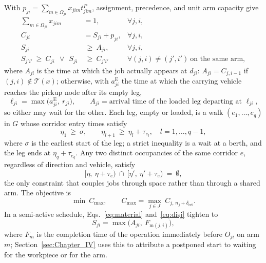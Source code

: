 \documentclass[manuscript,screen,review]{acmart}
\begin{document}
With $p_{ji}=\sum_{m\in\Omega_{ji}}x_{jim}t^P_{jim}$, assignment, precedence, and unit arm capacity give
\begin{align}
\sum_{m\in\Omega_{ji}} x_{jim} &= 1, & \forall j,i,
\label{eq:assign}\\
C_{ji} &= S_{ji}+p_{ji}, & \forall j,i,
\label{eq:dur}\\
S_{ji} &\ \ge\ A_{ji}, & \forall j,i,
\label{eq:material}\\
S_{j'i'}\ \ge\ C_{ji}\ \ \vee\ \ S_{ji} &\ \ge\ C_{j'i'}
& \forall (j,i)\neq(j',i')\ \text{on the same arm},
\label{eq:disj}
\end{align}
where $A_{ji}$ is the time at which the job actually appears at $d_{ji}$: $A_{ji}=C_{j,i-1}$ if $(j,i)\notin\mathcal{T}(x)$; otherwise, with $a^{\mathrm{E}}_{ji}$ the time at which the carrying vehicle reaches the pickup node after its empty leg,
\begin{equation}
\label{eq:load}
\ell_{ji}=\max\bigl(a^{\mathrm{E}}_{ji},\ r_{ji}\bigr),
\qquad
A_{ji}=\text{arrival time of the loaded leg departing at } \ell_{ji},
\end{equation}
so either may wait for the other.
Each leg, empty or loaded, is a walk $(e_1,\dots,e_q)$ in $G$ whose corridor entry times satisfy
\begin{equation}
\label{eq:walk}
\eta_1 \ \ge\ \sigma, \qquad
\eta_{l+1}\ \ge\ \eta_l+\tau_{e_l}, \quad l=1,\dots,q-1,
\end{equation}
where $\sigma$ is the earliest start of the leg; a strict inequality is a wait at a berth, and the leg ends at $\eta_q+\tau_{e_q}$.
Any two distinct occupancies of the same corridor $e$, regardless of direction and vehicle, satisfy
\begin{equation}
\label{eq:excl}
\bigl[\eta,\ \eta+\tau_e\bigr)\ \cap\
\bigl[\eta',\ \eta'+\tau_e\bigr)\ =\ \emptyset ,
\end{equation}
the only constraint that couples jobs through space rather than through a shared arm. The objective is
\begin{equation}
\label{eq:obj}
\min\ C_{\max},\qquad
C_{\max}=\max_{j\in J}\ C_{j,\,n_j+\delta_{\mathrm{ret}}} .
\end{equation}
In a semi-active schedule, Eqs.~\eqref{eq:material} and~\eqref{eq:disj} tighten to
\begin{equation}
\label{eq:bind}
S_{ji}=\max\bigl(A_{ji},\ F_{\mathrm{m}(j,i)}\bigr),
\end{equation}
where $F_m$ is the completion time of the operation immediately before $O_{ji}$ on arm $m$; Section~\ref{sec:Chapter_IV} uses this to attribute a postponed start to waiting for the workpiece or for the arm.
\end{document}

